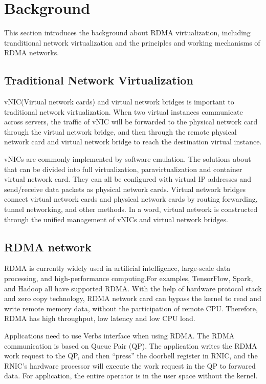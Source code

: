 \section{Background}
This section introduces the background about RDMA virtualization, including tranditional network virtualization and the principles and working mechanisms of RDMA networks.
	
\subsection{Traditional Network Virtualization}

vNIC(Virtual network cards) and virtual network bridges is important to traditional network virtualization. When two virtual instances communicate across servers, the traffic of vNIC will be forwarded to the physical network card through the virtual network bridge, and then through the remote physical network card and virtual network bridge to reach the destination virtual instance.

vNICs are commonly implemented by software emulation. The solutions about that can be divided into full virtualization, paravirtualization and container virtual network card. They can all be configured with virtual IP addresses and send/receive data packets as physical network cards. Virtual network bridges connect virtual network cards and physical network cards by routing forwarding, tunnel networking, and other methods. In a word, virtual network is constructed through the unified management of vNICs and virtual network bridges.

\subsection{RDMA network}
RDMA is currently widely used in artificial intelligence, large-scale data processing, and high-performance computing.For examples, TensorFlow, Spark, and Hadoop all have supported RDMA. With the help of hardware protocol stack and zero copy technology, RDMA network card can bypass the kernel to read and write remote memory data, without the participation of remote CPU. Therefore, RDMA has high throughput, low latency and low CPU load.

Applications need to use Verbs interface when using RDMA. The RDMA  communication is based on Queue Pair (QP). The application writes the RDMA work request to the QP, and then ``press''  the doorbell register in RNIC, and the RNIC's hardware processor will execute the work request in the QP to forwared data. For application, the entire operator is in the user space without the kernel.

